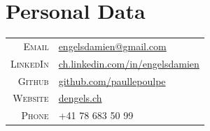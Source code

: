 \documentclass[a4paper,11pt]{article} %
\begin{document}



\section{Personal Data}
\begin{center}
\begin{tabular}{rl}
\textsc{Email} & 
\href{mailto:engelsdamien@gmail.com}{engelsdamien@gmail.com} \\

\textsc{LinkedIn} & 
\href{http://ch.linkedin.com/in/engelsdamien}{ch.linkedin.com/in/engelsdamien}\\

\textsc{Github} & 
\href{https://github.com/paullepoulpe}{github.com/paullepoulpe}\\

\textsc{Website} & 
\href{http://dengels.ch}{dengels.ch}\\

\textsc{Phone} & +41 78 683 50 99\\
\end{tabular}
\end{center}
\end{document}
